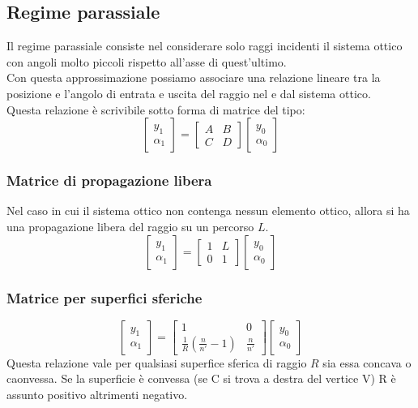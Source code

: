 \documentclass{article}
\begin{document}
\subsection*{Regime parassiale}
Il regime parassiale consiste nel considerare solo raggi incidenti il sistema ottico con angoli molto piccoli rispetto all'asse di quest'ultimo.\\
Con questa approssimazione possiamo associare una relazione lineare tra la posizione e l'angolo di entrata e uscita del raggio nel e dal sistema ottico.\\
Questa relazione è scrivibile sotto forma di matrice del tipo:
\[
\begin{bmatrix}
y_1\\
\alpha_1
\end{bmatrix}
=
\begin{bmatrix}
A	&	B\\
C	&	D
\end{bmatrix}
\begin{bmatrix}
y_0\\
\alpha_0
\end{bmatrix}
\]

\subsubsection*{Matrice di propagazione libera}
Nel caso in cui il sistema ottico non contenga nessun elemento ottico, allora si ha una propagazione libera del raggio su un percorso $L$.
\[
\begin{bmatrix}
y_1\\
\alpha_1
\end{bmatrix}
=
\begin{bmatrix}
1	&	L\\
0	&	1
\end{bmatrix}
\begin{bmatrix}
y_0\\
\alpha_0
\end{bmatrix}
\]

\subsubsection*{Matrice per superfici sferiche}
\[
\begin{bmatrix}
y_1\\
\alpha_1
\end{bmatrix}
=
\begin{bmatrix}
1	&	0\\
\frac{1}{R}(\frac{n}{n'}-1)	&	\frac{n}{n'}
\end{bmatrix}
\begin{bmatrix}
y_0\\
\alpha_0
\end{bmatrix}
\]
Questa relazione vale per qualsiasi superfice sferica di raggio $R$ sia essa concava o caonvessa. Se la superficie è convessa (se C si trova a destra del vertice V) R è assunto positivo altrimenti negativo.
\end{document}
